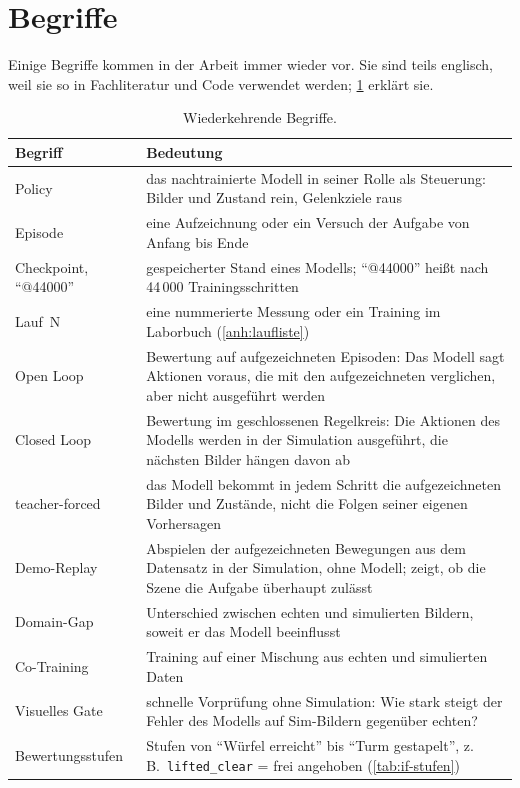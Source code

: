 \clearpage

\section{Begriffe}
\label{sec:begriffe}

Einige Begriffe kommen in der Arbeit immer wieder vor. Sie sind teils englisch, weil sie so in
Fachliteratur und Code verwendet werden; \cref{tab:begriffe} erklärt sie.

\begin{table}[htb]
  \centering
  \small
  \begin{tabularx}{\linewidth}{>{\raggedright\arraybackslash}p{3.2cm}X}
    \toprule
    Begriff & Bedeutung \\
    \midrule
    Policy & das nachtrainierte Modell in seiner Rolle als Steuerung: Bilder und Zustand rein,
      Gelenkziele raus \\
    Episode & eine Aufzeichnung oder ein Versuch der Aufgabe von Anfang bis Ende \\
    Checkpoint, \enquote{@44000} & gespeicherter Stand eines Modells; \enquote{@44000} heißt
      nach 44\,000 Trainingsschritten \\
    Lauf~N & eine nummerierte Messung oder ein Training im Laborbuch
      (\cref{anh:laufliste}) \\
    Open Loop & Bewertung auf aufgezeichneten Episoden: Das Modell sagt Aktionen voraus, die
      mit den aufgezeichneten verglichen, aber nicht ausgeführt werden \\
    Closed Loop & Bewertung im geschlossenen Regelkreis: Die Aktionen des Modells werden in der
      Simulation ausgeführt, die nächsten Bilder hängen davon ab \\
    teacher-forced & das Modell bekommt in jedem Schritt die aufgezeichneten Bilder und Zustände,
      nicht die Folgen seiner eigenen Vorhersagen \\
    Demo-Replay & Abspielen der aufgezeichneten Bewegungen aus dem Datensatz in der Simulation,
      ohne Modell; zeigt, ob die Szene die Aufgabe überhaupt zulässt \\
    Domain-Gap & Unterschied zwischen echten und simulierten Bildern, soweit er das Modell
      beeinflusst \\
    Co-Training & Training auf einer Mischung aus echten und simulierten Daten \\
    Visuelles Gate & schnelle Vorprüfung ohne Simulation: Wie stark steigt der Fehler des
      Modells auf Sim-Bildern gegenüber echten? \\
    Bewertungsstufen & Stufen von \enquote{Würfel erreicht} bis \enquote{Turm gestapelt}, z.\,B.\
      \texttt{lifted\_clear} = frei angehoben (\cref{tab:if-stufen}) \\
    \bottomrule
  \end{tabularx}
  \caption{Wiederkehrende Begriffe.}
  \label{tab:begriffe}
\end{table}

